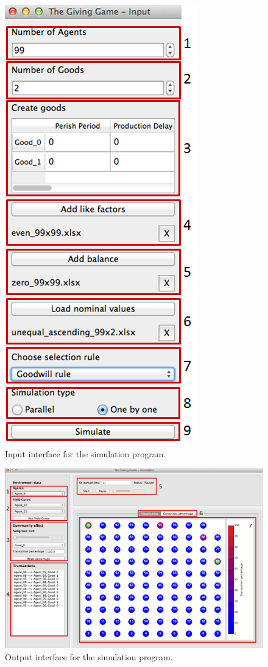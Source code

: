 \documentclass[twoside,openright]{uva-bachelor-thesis}
\begin{document}
\begin{figure}[h]
  \centering
  \includegraphics[scale=0.5]{Manual/Input}
  \caption{Input interface for the simulation program.}
\end{figure}
\begin{figure}[h]
  \centering
  \includegraphics[scale=0.5]{Manual/Output}
  \caption{Output interface for the simulation program.}
\end{figure}
\end{document}
